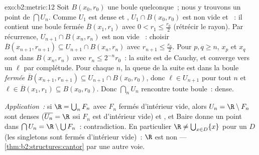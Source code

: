 \begin{solution}{exo:b2:metric:12}
Soit $B(x_0, r_0)$ une boule quelconque~; nous y trouvons un point de
$\bigcap U_n$. Comme $U_1$ est dense et , $U_1 \cap B(x_0, r_0)$
est non vide et ~: il contient une boule fermée $\overline
B(x_1, r_1)$ avec $0 < r_1 \leq \frac{r_0}2$ (rétrécir le rayon). Par
récurrence, $U_{n+1} \cap B(x_n, r_n)$ est non vide ~: choisir
$\overline B(x_{n+1}, r_{n+1}) \subseteq U_{n+1} \cap B(x_n, r_n)$
avec $r_{n+1} \leq \frac{r_n}2$. Pour $p, q \geq n$, $x_p$ et $x_q$
sont dans $B(x_n, r_n)$ avec $r_n \leq 2^{-n}r_0$~: la suite est de
Cauchy, et converge vers un $\ell$ par complétude. Pour chaque $n$,
la queue de la suite est dans la boule \emph{fermée} $\overline
B(x_{n+1}, r_{n+1}) \subseteq U_{n+1} \cap B(x_0, r_0)$, donc $\ell
\in U_{n+1}$ pour tout $n$ et $\ell \in \overline B(x_1, r_1)
\subseteq B(x_0, r_0)$. Donc $\bigcap_n U_n$ rencontre toute boule~:
dense.

\emph{Application~:} si $\R = \bigcup_n F_n$ avec $F_n$ fermés
d'intérieur vide, alors $U_n = \R \setminus F_n$ sont denses
($\overline{U_n} = \R$ ssi $F_n$ est d'intérieur vide) et , et
Baire donne un point dans $\bigcap U_n = \R \setminus \bigcup F_n$~:
contradiction. En particulier $\R \neq \bigcup_{x \in D} \{x\}$ pour
un $D$  (les singletons sont fermés d'intérieur vide)~:
$\R$ est non  --- \cref{thm:b2:structures:cantor} par une
autre voie.
\end{solution}

